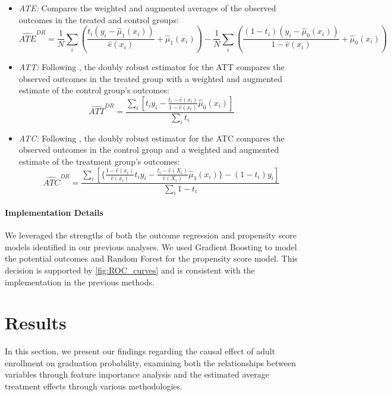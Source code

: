 \documentclass{article}
\newcommand{\gur}[1]{{\color{teal}{Gur: #1}}}
\begin{document}
\gur{Add explanation of augmentation?}

\begin{itemize}
    \item \textit{ATE:} Compares the weighted and augmented averages of the observed outcomes in the treated and control groups:
    \[
    \widehat{ATE}^{DR} = \frac{1}{N} \sum_i \left( \frac{t_i (y_i - \hat{\mu}_1(x_i))}{\hat{e}(x_i)} + \hat{\mu}_1(x_i) \right) - \frac{1}{N} \sum_i \left( \frac{(1 - t_i)(y_i - \hat{\mu}_0(x_i))}{1 - \hat{e}(x_i)} + \hat{\mu}_0(x_i) \right)
    \]
    
    \item \textit{ATT:} Following \citet{tao2019doubly}, the doubly robust estimator for the ATT compares the observed outcomes in the treated group with a weighted and augmented estimate of the control group's outcomes: 
    \[
    \widehat{ATT}^{DR} = \frac{\sum_i \left[ t_i y_i - \frac{ t_i - \hat{e}(x_i)}{1 - \hat{e}(x_i)} \hat{\mu}_0(x_i) \right]}{\sum_i t_i}
    \]
    
    \item \textit{ATC:} Following \citet{tao2019doubly}, the doubly robust estimator for the ATC compares the observed outcomes in the control group and a weighted and augmented estimate of the treatment group's outcomes:
    \[
    \widehat{ATC}^{DR} = \frac{\sum_i \left[ \{ \frac{ 1 - \hat{e}(x_i)}{\hat{e}(x_i)} t_i y_i - \frac{ t_i - \hat{e}(X_i)}{\hat{e}(X_i)} \hat{\mu}_1(x_i) \}   - (1-t_i)y_i \right]}{\sum_i 1 - t_i}
    \]
\end{itemize}

\paragraph{Implementation Details} We leveraged the strengths of both the outcome regression and propensity score models identified in our previous analyses. We used Gradient Boosting to model the potential outcomes and Random Forest for the propensity score model. This decision is supported by \ref{fig:ROC_curves} and is consistent with the implementation in the previous methods.

\section{Results}

In this section, we present our findings regarding the causal effect of adult enrollment on graduation probability, examining both the relationships between variables through feature importance analysis and the estimated average treatment effects through various methodologies.
\end{document}
